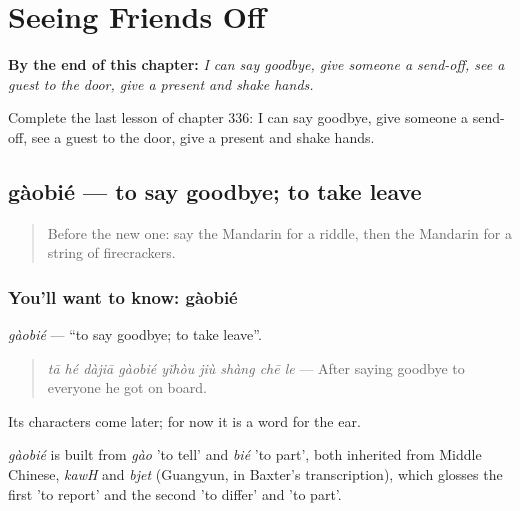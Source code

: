 
\chapter{Seeing Friends Off}
\label{ch:zh-seeing-friends-off}

\begin{chapteropening}
\textbf{By the end of this chapter:} \emph{I can say goodbye, give someone a send-off, see a guest to the door, give a present and shake hands.}

Complete the last lesson of chapter 336: I can say goodbye, give someone a send-off, see a guest to the door, give a present and shake hands.
\end{chapteropening}

\section[gàobié]{gàobié — to say goodbye; to take leave}

\label{lesson:ZH-C336-gaobie}



\begin{quote}
Before the new one: say the Mandarin for a riddle, then the Mandarin for a string of firecrackers.
\end{quote}

\subsection*{You'll want to know: gàobié}
\emph{gàobié} — \textquotedblleft{}to say goodbye; to take leave\textquotedblright{}.

\begin{quote}
\emph{tā hé dàjiā gàobié yǐhòu jiù shàng chē le} — After saying goodbye to everyone he got on board.
\end{quote}

Its characters come later; for now it is a word for the ear.

\begin{cousinweb}
\emph{gàobié} is built from \emph{gào} 'to tell' and \emph{bié} 'to part', both inherited from Middle Chinese, \emph{kawH} and \emph{bjet} (Guangyun, in Baxter's transcription), which glosses the first 'to report' and the second 'to differ' and 'to part'.
\end{cousinweb}

